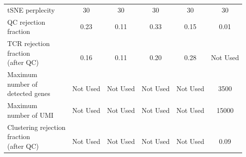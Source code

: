 \begin{table}[H]
\begin{tabular}{l|c c c c c}
tSNE perplecity & 30 & 30 & 30 & 30 & 30\\

\specialcell[t]{QC rejection\\fraction} & 0.23 & 0.11 & 0.33 & 0.15 & 0.01\\

\specialcell[t]{TCR rejection\\fraction\\(after QC)} & \specialcell[t]{ \\0.16\\ } & \specialcell[t]{ \\0.11\\ } & \specialcell[t]{ \\0.20\\ } & \specialcell[t]{ \\0.28\\ } & \specialcell[t]{ \\Not Used\\ }\\

\specialcell[t]{Maximum\\number of\\detected genes} & \specialcell[t]{ \\Not Used\\ } & \specialcell[t]{ \\Not Used\\ } & \specialcell[t]{ \\Not Used\\ } & \specialcell[t]{ \\Not Used\\ } & \specialcell[t]{ \\3500\\ }\\

\specialcell[t]{Maximum\\number of UMI} & Not Used & Not Used & Not Used & Not Used & 15000\\

\specialcell[t]{Clustering rejection\\fraction\\(after QC)} & \specialcell[t]{ \\Not Used\\ } & \specialcell[t]{ \\Not Used\\ } & \specialcell[t]{ \\Not Used\\ } & \specialcell[t]{ \\Not Used\\ } & \specialcell[t]{ \\0.09\\ }\\
\hline 
\end{tabular}
\end{table}

